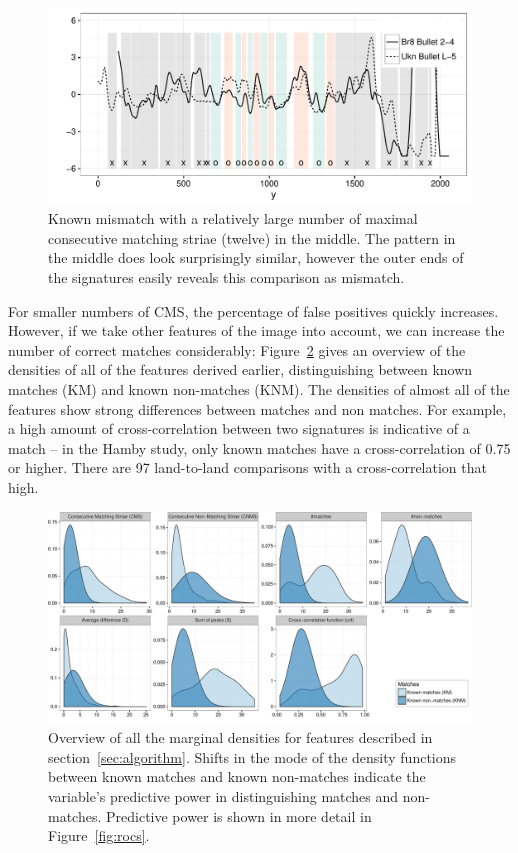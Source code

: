 \documentclass[aoas, preprint]{imsart}\usepackage[]{graphicx}\usepackage[]{color}
\newenvironment{knitrout}{}{} %
\begin{document}
\begin{figure}[hbtp]
  \centering
\begin{knitrout}
\color{fgcolor}
\includegraphics[width=.65\textwidth]{strange-res-1} 

\end{knitrout}
\caption{\label{fig:mismatch}Known mismatch with a relatively large number of maximal consecutive matching striae (twelve) in the middle. The pattern in the middle does look surprisingly similar, however the outer ends of the signatures easily reveals this comparison as mismatch. }
\end{figure}

For smaller numbers of CMS, the percentage of false positives quickly increases. However, if we take other features of the image into account, we can increase the number of correct matches considerably: Figure~\ref{fig:densities} gives an overview of the densities of all of the features derived earlier, distinguishing between known matches (KM) and known non-matches (KNM). The densities of almost all of the features show strong differences between matches and non matches. For example, a high amount of cross-correlation between two signatures is indicative of a match --  in the Hamby study, only known matches have a cross-correlation of 0.75 or higher. There are 97 land-to-land comparisons with a cross-correlation that high.

\begin{figure}[hbtp]
  \centering
\begin{knitrout}
\color{fgcolor}
\includegraphics[width=\textwidth]{density-overview-1} 

\end{knitrout}
\caption{\label{fig:densities}Overview of all the marginal densities for features described in section~\ref{sec:algorithm}. Shifts in the mode of the density functions between known matches and known non-matches indicate the variable's predictive power in distinguishing matches and non-matches. Predictive power is shown in more detail in Figure~\ref{fig:rocs}.}
\end{figure}
\end{document}
